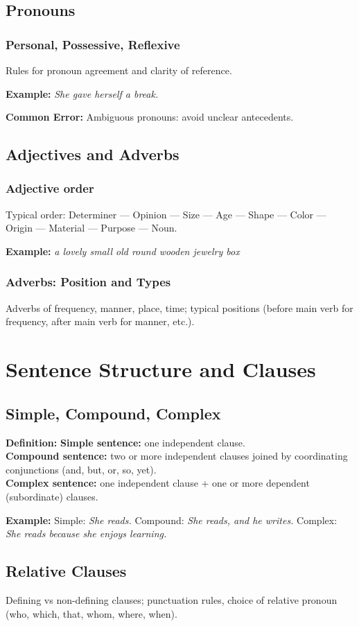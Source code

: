 \documentclass[12pt,oneside]{book}
\newcommand{\ex}[1]{\begin{examplebox}\textbf{Example:} #1\end{examplebox}}
\newcommand{\cerror}[1]{\begin{commonerr}\textbf{Common Error:} #1\end{commonerr}}
\newcommand{\defbox}[1]{\begin{definitionbox}\textbf{Definition:} #1\end{definitionbox}}
\begin{document}
\section{Pronouns}
\subsection{Personal, Possessive, Reflexive}
Rules for pronoun agreement and clarity of reference.

\ex{\textit{She gave herself a break.}} 
\cerror{Ambiguous pronouns: avoid unclear antecedents.}

\section{Adjectives and Adverbs}
\subsection{Adjective order}
Typical order: Determiner — Opinion — Size — Age — Shape — Color — Origin — Material — Purpose — Noun.\
\ex{\textit{a lovely small old round wooden jewelry box}}

\subsection{Adverbs: Position and Types}
Adverbs of frequency, manner, place, time; typical positions (before main verb for frequency, after main verb for manner, etc.).

\chapter{Sentence Structure and Clauses}
\section{Simple, Compound, Complex}
\defbox{\textbf{Simple sentence:} one independent clause. \\ \textbf{Compound sentence:} two or more independent clauses joined by coordinating conjunctions (and, but, or, so, yet). \\ \textbf{Complex sentence:} one independent clause + one or more dependent (subordinate) clauses.}

\ex{Simple: \textit{She reads.} Compound: \textit{She reads, and he writes.} Complex: \textit{She reads because she enjoys learning.}}

\section{Relative Clauses}
Defining vs non-defining clauses; punctuation rules, choice of relative pronoun (who, which, that, whom, where, when).
\end{document}

